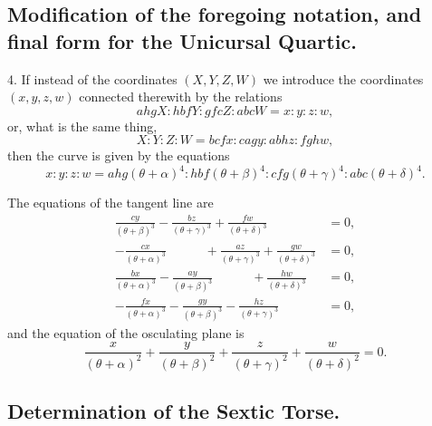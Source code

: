 \documentclass[11pt,a4paper]{article}
\begin{document}
\subsection*{Modification of the foregoing notation, and final form for the Unicursal Quartic.}

4. If instead of the coordinates $(X, Y, Z, W)$ we introduce the coordinates $(x, y, z, w)$ connected therewith by the relations
\[
ahgX : hbfY : gfcZ : abcW = x : y : z : w,
\]
or, what is the same thing,
\[
X : Y : Z : W = bcfx : cagy : abhz : fghw,
\]
then the curve is given by the equations
\[
x : y : z : w = ahg(\theta + \alpha)^4 : hbf(\theta + \beta)^4 : cfg(\theta + \gamma)^4 : abc(\theta + \delta)^4.
\]

The equations of the tangent line are
\begin{align*}
\frac{cy}{(\theta + \beta)^3} - \frac{bz}{(\theta + \gamma)^3} + \frac{fw}{(\theta + \delta)^3} &= 0, \\
-\frac{cx}{(\theta + \alpha)^3} \qquad\quad + \frac{az}{(\theta + \gamma)^3} + \frac{gw}{(\theta + \delta)^3} &= 0, \\
\frac{bx}{(\theta + \alpha)^3} - \frac{ay}{(\theta + \beta)^3} \qquad\quad + \frac{hw}{(\theta + \delta)^3} &= 0, \\
-\frac{fx}{(\theta + \alpha)^3} - \frac{gy}{(\theta + \beta)^3} - \frac{hz}{(\theta + \gamma)^3} \qquad\quad &= 0,
\end{align*}
and the equation of the osculating plane is
\[
\frac{x}{(\theta + \alpha)^2} + \frac{y}{(\theta + \beta)^2} + \frac{z}{(\theta + \gamma)^2} + \frac{w}{(\theta + \delta)^2} = 0.
\]

\subsection*{Determination of the Sextic Torse.}
\end{document}
